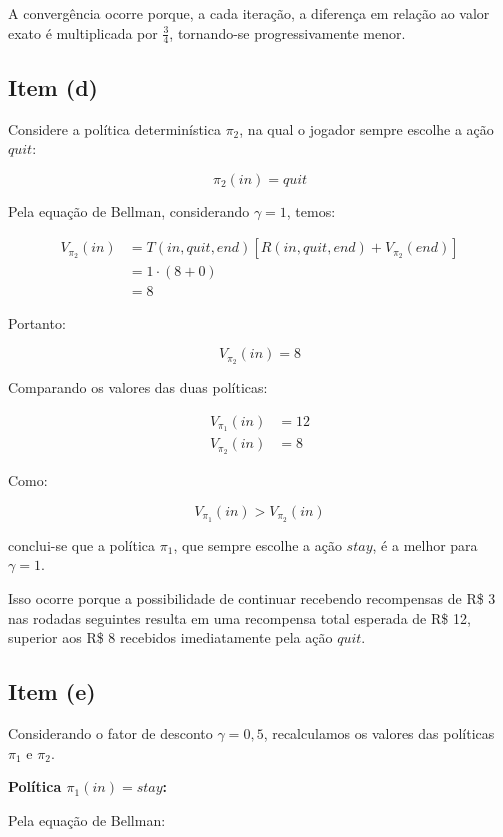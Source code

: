 A convergência ocorre porque, a cada iteração,
a diferença em relação ao valor exato é
multiplicada por $\frac{3}{4}$, tornando-se
progressivamente menor.


\subsection{Item (d)}

Considere a política determinística $\pi_2$,
na qual o jogador sempre escolhe a ação $quit$:

\[
    \pi_2(in) = quit
\]

Pela equação de Bellman, considerando
$\gamma = 1$, temos:

\[
\begin{aligned}
    V_{\pi_2}(in)
    &= T(in,quit,end)
    \left[
        R(in,quit,end) + V_{\pi_2}(end)
    \right]
    \\[6pt]
    &= 1 \cdot (8 + 0)
    \\[6pt]
    &= 8
\end{aligned}
\]

Portanto:

\[
    \boxed{V_{\pi_2}(in) = 8}
\]

Comparando os valores das duas políticas:

\[
\begin{aligned}
    V_{\pi_1}(in) &= 12\\
    V_{\pi_2}(in) &= 8
\end{aligned}
\]

Como:

\[
    V_{\pi_1}(in) > V_{\pi_2}(in)
\]

conclui-se que a política $\pi_1$, que sempre
escolhe a ação $stay$, é a melhor para
$\gamma = 1$.

Isso ocorre porque a possibilidade de continuar
recebendo recompensas de R\$ 3 nas rodadas
seguintes resulta em uma recompensa total
esperada de R\$ 12, superior aos R\$ 8
recebidos imediatamente pela ação $quit$.


\subsection{Item (e)}

Considerando o fator de desconto $\gamma = 0{,}5$,
recalculamos os valores das políticas $\pi_1$
e $\pi_2$.

\textbf{Política $\pi_1(in) = stay$:}

Pela equação de Bellman:

